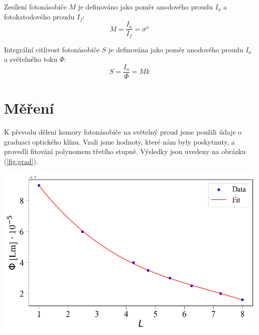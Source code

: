 \documentclass[a4paper,11pt]{article}
\begin{document}
\newpage
    \begin{minipage}[t]{0.5\textwidth} 
                \vspace{-50pt}
                \par Zesílení fotonásobiče $M$ je definováno jako poměr anodového proudu $I_a$ a fotokatodového proudu $I_f$:
                \begin{equation}
                    M = \frac{I_a}{I_f} = \sigma^n
                \end{equation}

                \par Integrální citlivost fotonásobiče $S$ je definována jako poměr anodového proudu $I_a$ a světelného toku $\Phi$:
                \begin{equation}
                    S = \frac{I_a}{\Phi} = Mk
                \end{equation}

        \section{Měření}
                K převodu dělení komory fotonásobiče na světelný proud jsme použili údaje o graduaci optického klínu. Vzali jsme hodnoty, které nám byly poskytnuty, a provedli fitování polynomem třetího stupně. Výsledky jsou uvedeny na obrázku (\ref{fig:grad}). 

                \vspace{10pt}   
                \par \centering
                \includegraphics[scale=0.33]{grad}
                \captionsetup{justification=centering, font=footnotesize}
                \label{fig:grad}
                \vspace{10pt}
                \raggedright 


\end{minipage}
\end{document}
